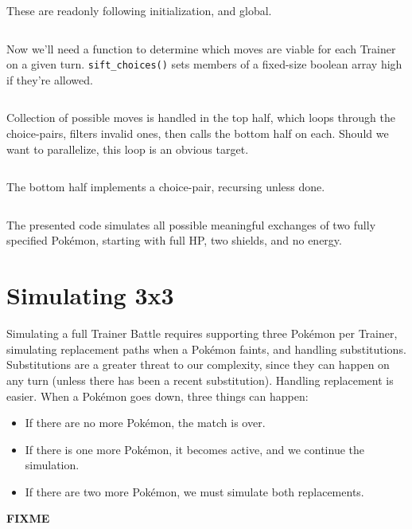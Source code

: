 These are readonly following initialization, and global.
\inputminted{cpp}{s/simul.h}
Now we'll need a function to determine which moves are viable for each Trainer on a given turn.
\texttt{sift\_choices()} sets members of a fixed-size boolean array high if they're allowed.
\inputminted{cpp}{s/sift.h}
Collection of possible moves is handled in the top half, which loops through the choice-pairs,
  filters invalid ones, then calls the bottom half on each.
Should we want to parallelize, this loop is an obvious target.
\inputminted{cpp}{s/top.h}
The bottom half implements a choice-pair, recursing unless done.
\inputminted{cpp}{s/bottom.h}
The presented code simulates all possible meaningful exchanges of two fully specified Pokémon, starting
  with full HP, two shields, and no energy.

\section{Simulating 3x3}
\label{sec:simul3x3}
Simulating a full Trainer Battle requires supporting three Pokémon per Trainer,
  simulating replacement paths when a Pokémon faints,
  and handling substitutions.
Substitutions are a greater threat to our complexity, since they can happen
  on any turn (unless there has been a recent substitution).
Handling replacement is easier.
When a Pokémon goes down, three things can happen:
\begin{itemize}
  \item If there are no more Pokémon, the match is over.
  \item If there is one more Pokémon, it becomes active, and we continue the simulation.
  \item If there are two more Pokémon, we must simulate both replacements.
\end{itemize}
\textbf{FIXME}
